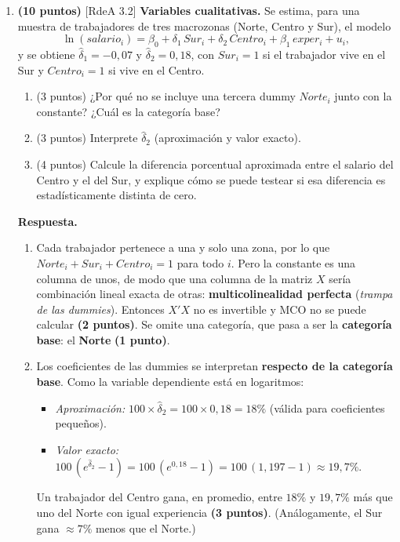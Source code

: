 \documentclass[12pt,letterpaper]{article}
\newcommand{\rdea}[1]{\textsf{\small [RdeA #1]}}
\newcommand{\sol}{\color{blue}}
\begin{document}
\begin{enumerate}
\item \textbf{(10 puntos)} \rdea{3.2} \textbf{Variables cualitativas.} Se estima, para una muestra de trabajadores de tres macrozonas (Norte, Centro y Sur), el modelo
\[
\ln(salario_i)=\beta_0+\delta_1\,Sur_i+\delta_2\,Centro_i+\beta_1\,exper_i+u_i,
\]
y se obtiene $\hat\delta_1=-0{,}07$ y $\hat\delta_2=0{,}18$, con $Sur_i=1$ si el trabajador vive en el Sur y $Centro_i=1$ si vive en el Centro.

\begin{enumerate}[label=\alph*)]
    \item (3 puntos) ¿Por qué no se incluye una tercera dummy $Norte_i$ junto con la constante? ¿Cuál es la categoría base?
    \item (3 puntos) Interprete $\hat\delta_2$ (aproximación y valor exacto).
    \item (4 puntos) Calcule la diferencia porcentual aproximada entre el salario del Centro y el del Sur, y explique cómo se puede testear si esa diferencia es estadísticamente distinta de cero.
\end{enumerate}

{\sol
\textbf{Respuesta.}
\begin{enumerate}[label=\alph*)]
    \item Cada trabajador pertenece a una y solo una zona, por lo que $Norte_i+Sur_i+Centro_i=1$ para todo $i$. Pero la constante es una columna de unos, de modo que una columna de la matriz $X$ sería combinación lineal exacta de otras: \textbf{multicolinealidad perfecta} (\textit{trampa de las dummies}). Entonces $X'X$ no es invertible y MCO no se puede calcular \textbf{(2 puntos)}. Se omite una categoría, que pasa a ser la \textbf{categoría base}: el \textbf{Norte} \textbf{(1 punto)}.

    \item Los coeficientes de las dummies se interpretan \textbf{respecto de la categoría base}. Como la variable dependiente está en logaritmos:
    \begin{itemize}
        \item \textit{Aproximación:} $100\times\hat\delta_2=100\times0{,}18=18\%$ (válida para coeficientes pequeños).
        \item \textit{Valor exacto:} $100\,(e^{\hat\delta_2}-1)=100\,(e^{0{,}18}-1)=100\,(1{,}197-1)\approx19{,}7\%$.
    \end{itemize}
    Un trabajador del Centro gana, en promedio, entre $18\%$ y $19{,}7\%$ más que uno del Norte con igual experiencia \textbf{(3 puntos)}. (Análogamente, el Sur gana $\approx7\%$ menos que el Norte.)


\end{enumerate}}
\end{enumerate}
\end{document}
